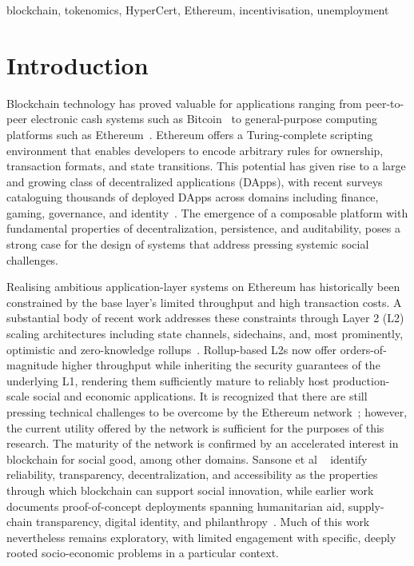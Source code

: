 \documentclass[conference]{IEEEtran}
\begin{document}
\begin{IEEEkeywords}
	blockchain, tokenomics, HyperCert, Ethereum, incentivisation, unemployment
\end{IEEEkeywords}

\section{Introduction}
Blockchain technology has proved valuable for applications ranging from peer-to-peer electronic cash systems such as Bitcoin~\cite{nakamoto2008bitcoin} to general-purpose computing platforms such as Ethereum~\cite{buterin2014ethereum}. Ethereum offers a Turing-complete scripting environment that enables developers to encode arbitrary rules for ownership, transaction formats, and state transitions. This potential has given rise to a large and growing class of decentralized applications (DApps), with recent surveys cataloguing thousands of deployed DApps across domains including finance, gaming, governance, and identity~\cite{zheng2023dapp}. The emergence of a composable platform with fundamental properties of decentralization, persistence, and auditability, poses a strong case for the design of systems that address pressing systemic social challenges.

Realising ambitious application-layer systems on Ethereum has historically been constrained by the base layer's limited throughput and high transaction costs. A substantial body of recent work addresses these constraints through Layer 2 (L2) scaling architectures including state channels, sidechains, and, most prominently, optimistic and zero-knowledge rollups~\cite{sguanci2021layer2,thibault2022rollups}. Rollup-based L2s now offer orders-of-magnitude higher throughput while inheriting the security guarantees of the underlying L1, rendering them sufficiently mature to reliably host production-scale social and economic applications. It is recognized that there are still pressing technical challenges to be overcome by the Ethereum network~\cite{ef2025trillion}; however, the current utility offered by the network is sufficient for the purposes of this research. The maturity of the network is confirmed by an accelerated interest in blockchain for social good, among other domains. Sansone et al ~\cite{sansone2023blockchain} identify reliability, transparency, decentralization, and accessibility as the properties through which blockchain can support social innovation, while earlier work documents proof-of-concept deployments spanning humanitarian aid, supply-chain transparency, digital identity, and philanthropy~\cite{marino2018blockchain}. Much of this work nevertheless remains exploratory, with limited engagement with specific, deeply rooted socio-economic problems in a particular context.
\end{document}
